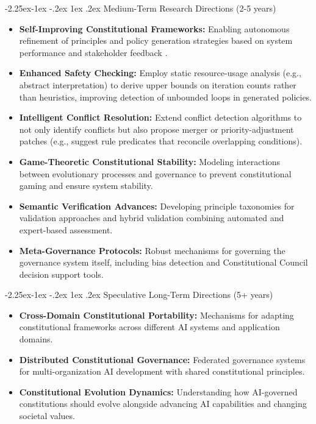 \documentclass[manuscript,screen,review,anonymous,9pt]{acmart}
\makeatletter
\renewcommand\subsection{\@startsection{subsection}{2}{\z@}%
  {-2.25ex\@plus -1ex \@minus -.2ex}%
  {1ex \@plus .2ex}%
  {\normalfont\large\bfseries}}
\makeatother
\begin{document}
\subsection{Medium-Term Research Directions (2-5 years)}
\label{subsec:medium_term_research}
\begin{itemize}
    \item \textbf{Self-Improving Constitutional Frameworks:} Enabling autonomous refinement of principles and policy generation strategies based on system performance and stakeholder feedback \cite{Zhao2025AbsoluteZero}.
    \item \textbf{Enhanced Safety Checking:} Employ static resource-usage analysis (e.g., abstract interpretation) to derive upper bounds on iteration counts rather than heuristics, improving detection of unbounded loops in generated policies.
    \item \textbf{Intelligent Conflict Resolution:} Extend conflict detection algorithms to not only identify conflicts but also propose merger or priority-adjustment patches (e.g., suggest rule predicates that reconcile overlapping conditions).
    \item \textbf{Game-Theoretic Constitutional Stability:} Modeling interactions between evolutionary processes and governance to prevent constitutional gaming and ensure system stability.
    \item \textbf{Semantic Verification Advances:} Developing principle taxonomies for validation approaches and hybrid validation combining automated and expert-based assessment.
    \item \textbf{Meta-Governance Protocols:} Robust mechanisms for governing the governance system itself, including bias detection and Constitutional Council decision support tools.
\end{itemize}

\subsection{Speculative Long-Term Directions (5+ years)}
\begin{itemize}
    \item \textbf{Cross-Domain Constitutional Portability:} Mechanisms for adapting constitutional frameworks across different AI systems and application domains.
    \item \textbf{Distributed Constitutional Governance:} Federated governance systems for multi-organization AI development with shared constitutional principles.
    \item \textbf{Constitutional Evolution Dynamics:} Understanding how AI-governed constitutions should evolve alongside advancing AI capabilities and changing societal values.
\end{itemize}
\end{document}
